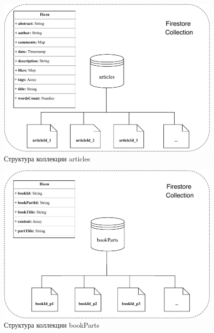 \begin{figure}[h]
	\centering
	\includegraphics[width=\textwidth, keepaspectratio]{figures/articles}
	\caption{Структура коллекции articles}
	\label{fig:articlesDiagram}
\end{figure}

\begin{figure}[h]
	\centering
	\includegraphics[width=\textwidth, keepaspectratio]{figures/bookpart}
	\caption{Структура коллекции bookParts}
	\label{fig:bookPartsDiagram}
\end{figure}

